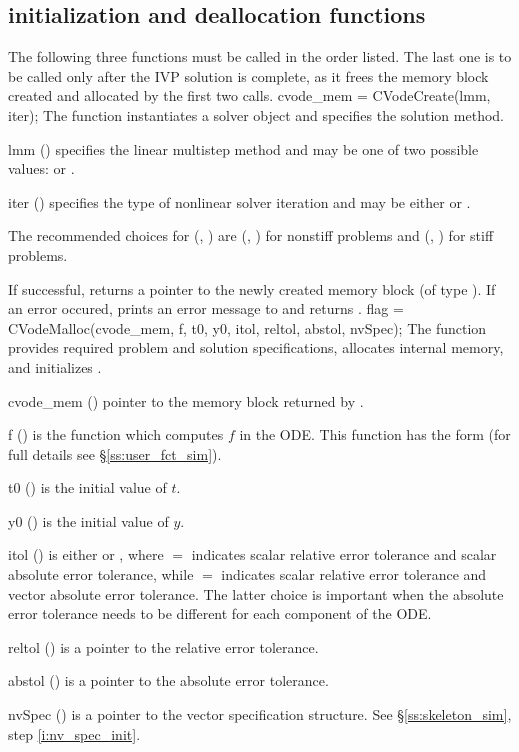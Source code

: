 \subsection{{\cvode} initialization and deallocation functions}
\label{sss:cvodemalloc}
The following three functions must be called in the order listed. The last one is to be 
called only after the IVP solution is complete, as it frees the {\cvode} memory block
created and allocated by the first two calls.
{
  cvode\_mem = CVodeCreate(lmm, iter);
}
{
  The function  instantiates a {\cvode} solver object and specifies 
  the solution method.
}
{
  \begin{args}[iter]
  \item[lmm] ()
    specifies the linear multistep method and may be one of two
    possible values:  or .     
  \item[iter] ()
    specifies the type of nonlinear solver iteration and may be
    either  or . 
  \end{args}
  The recommended choices for (, ) are
  (, ) for nonstiff problems and
  (, ) for stiff problems.
}
{
  If successful,  returns a pointer to the newly created 
  {\cvode} memory block (of type ).
  If an error occured,  prints an error message to 
  and returns .
}
{}
{
flag = CVodeMalloc(cvode\_mem, f, t0, y0, itol, reltol, abstol, nvSpec);
}
{
  The function  provides required problem and solution specifications, 
  allocates internal memory, and initializes {\cvode}.
}
{
  \begin{args}[abstol]
  \item[cvode\_mem] ()
    pointer to the {\cvode} memory block returned by .
  \item[f] ()
    is the {\C} function which computes $f$ in the ODE. This function has the form 
     (for full details see \S\ref{ss:user_fct_sim}).
  \item[t0] ()
    is the initial value of $t$.
  \item[y0] ()
    is the initial value of $y$. 
  \item[itol] () 
    is either  or , where $=$ indicates scalar relative error 
    tolerance and scalar absolute error tolerance, while $=$ indicates scalar
    relative error tolerance and vector absolute error tolerance. 
    The latter choice is important when the absolute error tolerance needs to
    be different for each component of the ODE. 
  \item[reltol] ()
    is a pointer to the relative error tolerance.
  \item[abstol] ()
    is a pointer to the absolute error tolerance.
  \item[nvSpec] ()
    is a pointer to the vector specification structure. See \S\ref{ss:skeleton_sim}, 
    step \ref{i:nv_spec_init}.
  \end{args}
}
